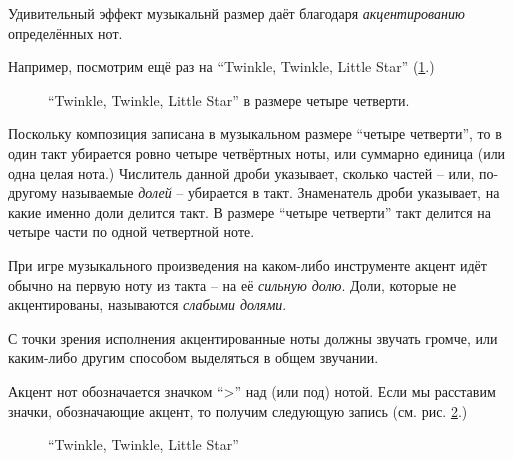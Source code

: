 \documentclass[a4paper,twoside]{book}
\begin{document}
Удивительный эффект музыкальнй размер даёт благодаря \emph{акцентированию}
определённых нот.

Например, посмотрим ещё раз на ``Twinkle, Twinkle, Little Star''
(\ref{fig:lilypond-musical-scale-example-1}.)

\begin{figure}[ht]
  \caption{``Twinkle, Twinkle, Little Star'' в размере четыре четверти.}
  \centering
  \label{fig:lilypond-musical-scale-example-1}
\end{figure}

Поскольку композиция записана в музыкальном размере ``четыре четверти'', то в
один такт убирается ровно четыре четвёртных ноты, или суммарно единица (или одна
целая нота.)  Числитель данной дроби указывает, сколько частей -- или, по-другому
называемые \emph{долей} -- убирается в такт.  Знаменатель дроби указывает, на
какие именно доли делится такт.  В размере ``четыре четверти'' такт делится на
четыре части по одной четвертной ноте.

При игре музыкального произведения на каком-либо инструменте акцент идёт обычно
на первую ноту из такта -- на её \emph{сильную долю}.  Доли, которые не
акцентированы, называются \emph{слабыми долями}.

С точки зрения исполнения акцентированные ноты должны звучать громче, или
каким-либо другим способом выделяться в общем звучании.

Акцент нот обозначается значком ``>'' над (или под) нотой.  Если мы расставим
значки, обозначающие акцент, то получим следующую запись
(см. рис. \ref{fig:lilypond-musical-scale-example-2}.)

\begin{figure}[ht]
  \caption{``Twinkle, Twinkle, Little Star''}
  \centering
  \label{fig:lilypond-musical-scale-example-2}
\end{figure}
\end{document}

